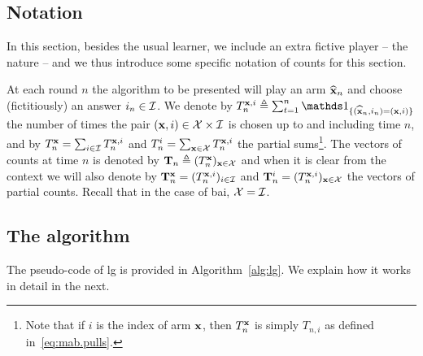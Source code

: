 
\subsection{Notation}

In this section, besides the usual learner, we include an extra fictive player -- the nature -- and we thus introduce some specific notation of counts for this section.

At each round $n$ the algorithm to be presented will play an arm $\widehat{{\bf x}}_n$ and choose (fictitiously) an answer $i_n\in\mathcal{I}$. We denote by $T_n^{\bx,i} \eqdef\sum_{t=1}^n \ind_{\{(\hbx_n,i_n)=(\bx,i)\}}$ the number of times the pair $({\bf x},i)\in\mathcal{X}\times\mathcal{I}$ is chosen up to and including time $n$, and by $T_n^{\bf x} =\sum_{i\in\mathcal{I}} T_n^{{\bf x},i}$ and $T_n^i =\sum_{{\bf x}\in\mathcal{X}} T_n^{{\bf x},i}$ the partial sums\footnote{Note that if $i$ is the index of arm ${\bf x}$, then $T_n^{\bf x}$ is simply $T_{n,i}$ as defined in~\eqref{eq:mab.pulls}.}. The vectors of counts at time $n$ is denoted by ${\bf T}_n \triangleq (T_n^{\bf x})_{{\bf x}\in\mathcal{X}}$
and when it is clear from the context we will also denote by ${\bf T}_n^{{\bf x}} = (T_n^{{\bf x},i})_{i\in\mathcal{I}}$ and ${\bf T}_n^i = (T_n^{{\bf x},i})_{{\bf x}\in\mathcal{X}}$ the vectors of partial counts. Recall that in the case of \gls{bai}, $\mathcal{X}=\mathcal{I}$.



\subsection{The \LG{} algorithm}

The pseudo-code of \gls{lg} is provided in Algorithm~\ref{alg:lg}. We explain how it works in detail in the next.

